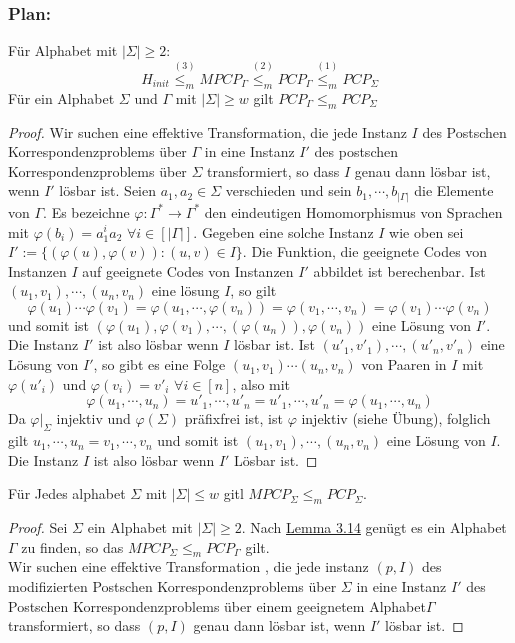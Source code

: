  \subsubsection*{Plan: } Für Alphabet mit $|\Sigma| \geq 2$: \[H_{init} \stackrel{(3)}{\leq_m} MPCP_{\Gamma} \stackrel{(2)}{\leq_m} PCP_{\Gamma} \stackrel{(1)}{\leq_m} PCP_{\Sigma}\]
   Für ein Alphabet $\Sigma$ und $\Gamma$ mit $|\Sigma| \geq w$ gilt $PCP_{\Gamma} \leq_m PCP_{\Sigma}$
  \begin{proof}
    Wir suchen eine effektive Transformation, die jede Instanz $I$ des Postschen Korrespondenzproblems über $\Gamma$ in eine Instanz $I'$ des postschen Korrespondenzproblems über $\Sigma$ transformiert, so dass $I$ genau dann lösbar ist, wenn $I'$ lösbar ist. Seien $a_1, a_2 \in \Sigma$ verschieden und sein $b_1, \cdots, b_{|\Gamma|}$ die Elemente von $\Gamma$. Es bezeichne $\varphi : \Gamma^* \to \Gamma^*$ den eindeutigen Homomorphismus von Sprachen mit $\varphi (b_i) = a^i_1 a_2$ $\forall i \in [|\Gamma|]$. Gegeben eine solche Instanz $I$ wie oben sei $I' := \{(\varphi(u), \varphi(v)) : (u, v) \in I\}$. Die Funktion, die geeignete Codes von Instanzen $I$ auf geeignete Codes von Instanzen $I'$ abbildet ist berechenbar. Ist $(u_1, v_1), \cdots, (u_n, v_n)$ eine lösung $I$, so gilt \[\varphi(u_1) \cdots \varphi(v_1) = \varphi(u_1, \cdots, \varphi(v_n)) = \varphi(v_1, \cdots, v_n) = \varphi(v_1) \cdots \varphi(v_n)\] und somit ist $(\varphi(u_1), \varphi(v_1), \cdots, (\varphi(u_n)), \varphi(v_n))$ eine Lösung von $I'$. Die Instanz $I'$ ist also lösbar wenn $I$ lösbar ist. Ist $(u'_1, v'_1), \cdots, (u'_n, v'_n)$ eine Lösung von $I'$, so gibt es eine Folge $(u_1, v_1)\cdots (u_n, v_n)$ von Paaren in $I$ mit $\varphi(u'_i)$ und $\varphi(v_i) = v'_i$ $\forall i \in [n]$, also mit \[\varphi(u_1, \cdots, u_n) = u'_1, \cdots, u'_n = u'_1, \cdots, u'_n =\varphi(u_1, \cdots, u_n)\] Da $\varphi \vert_{\Sigma}$ injektiv und $\varphi (\Sigma)$ präfixfrei ist, ist $\varphi$ injektiv (siehe Übung), folglich gilt $u_1, \cdots, u_n = v_1, \cdots, v_n$ und somit ist $(u_1, v_1), \cdots, (u_n, v_n)$ eine Lösung von $I$. Die Instanz $I$ ist also lösbar wenn $I'$ Lösbar ist.
  \end{proof}


   Für Jedes alphabet $\Sigma$ mit $|\Sigma| \leq w$ gitl $MPCP_{\Sigma} \leq_m PCP_{\Sigma}$.
  \begin{proof}
    Sei $\Sigma$ ein Alphabet mit $|\Sigma| \geq 2$. Nach \hyperref[subsec:3.14]{Lemma 3.14}  genügt es ein Alphabet $\Gamma$ zu finden, so das $MPCP_{\Sigma} \leq_m PCP_{\Gamma}$ gilt. \\Wir suchen eine effektive Transformation , die jede instanz $(p, I)$ des modifizierten Postschen Korrespondenzproblems über $\Sigma$ in eine Instanz $I'$ des Postschen Korrespondenzproblems über einem geeignetem Alphabet$\Gamma$ transformiert, so dass $(p, I)$ genau dann lösbar ist, wenn $I'$ lösbar ist.
  \end{proof}

